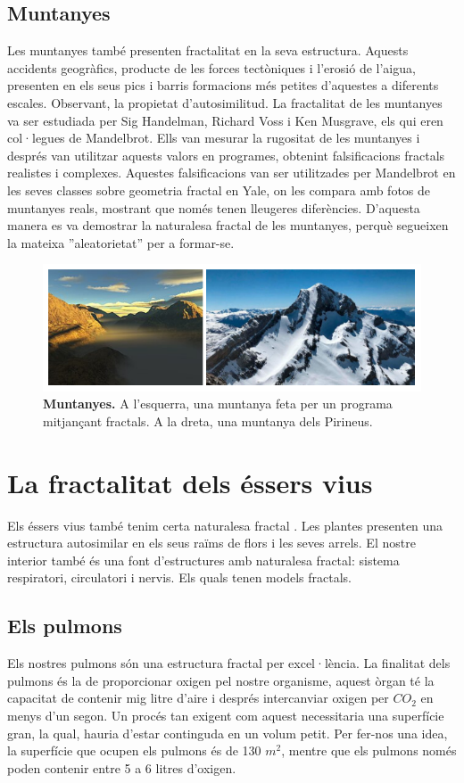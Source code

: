 \documentclass[12pt,a4paper]{report}
\begin{document}
\subsection{Muntanyes}
Les muntanyes també presenten fractalitat en la seva estructura. Aquests accidents geogràfics, producte de les forces tectòniques i l'erosió de l'aigua, presenten en els seus pics i barris formacions més petites d'aquestes a diferents escales. Observant, la propietat d'autosimilitud. La  fractalitat  de les muntanyes va ser estudiada per Sig Handelman, Richard Voss i Ken Musgrave, els qui eren col·legues de Mandelbrot. Ells van mesurar la rugositat de les muntanyes i després van utilitzar aquests valors en programes, obtenint falsificacions fractals realistes i complexes. Aquestes falsificacions van ser utilitzades per Mandelbrot en les seves classes sobre geometria fractal en  Yale, on les compara amb fotos de muntanyes reals, mostrant que només tenen lleugeres diferències. D'aquesta manera es va demostrar la naturalesa fractal de les muntanyes, perquè segueixen la mateixa ''aleatorietat'' per a formar-se.
\begin{figure}[!ht]
\centering
\includegraphics[scale=1]{img/img04_mountains.pdf}
\caption{\textbf{Muntanyes.} A l'esquerra, una muntanya feta per un programa mitjançant fractals. A la dreta, una muntanya dels Pirineus.}
\end{figure}
\section{La fractalitat dels éssers vius}
Els éssers vius també tenim certa naturalesa fractal \cite[p.~55]{FractalWorlds}. Les plantes presenten una estructura autosimilar en els seus raïms de flors i les seves arrels. El nostre interior també és una font d'estructures amb naturalesa fractal: sistema respiratori, circulatori i nervis. Els quals tenen models fractals.
\subsection{Els pulmons}
Els nostres pulmons són una estructura fractal per excel·lència. La finalitat dels pulmons és la de proporcionar oxigen pel nostre organisme, aquest òrgan té la capacitat de contenir mig litre d'aire i després intercanviar oxigen per $CO_{2}$ en menys d'un segon. Un procés tan exigent com aquest necessitaria una superfície gran, la qual, hauria d'estar continguda en un volum petit. Per fer-nos una idea, la superfície que ocupen els pulmons és de 130 $m^{2}$, mentre que els pulmons només poden contenir entre 5 a 6 litres d'oxigen. 
\end{document}
